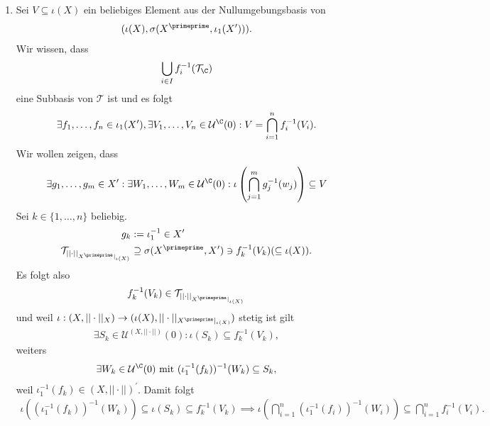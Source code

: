 \begin{solution}
\begin{enumerate}[label = (\arabic*)]
  \item Sei $V \subseteq \iota(X)$ ein beliebiges Element aus der Nullumgebungsbasis von
  \begin{align*}
    (\iota(X),\sigma(X^{\primeprime},\iota_1(X^{\prime}))).
  \end{align*}
  Wir wissen, dass
  \begin{align*}
    \bigcup_{i \in I}f_i^{-1}(\mathcal{T}_{\C})
  \end{align*}
  eine Subbasis von $\mathcal{T}$ ist und es folgt
  \begin{align*}
    \exists f_1,\dots,f_n \in \iota_1(X^{\prime}), \exists V_1,\dots,V_n \in \mathcal{U}^{\C}(0):
    V = \bigcap_{i=1}^n f_i^{-1}(V_i).
  \end{align*}
  Wir wollen zeigen, dass
  \begin{align*}
    \exists g_1,\dots,g_m \in X^{\prime}: \exists W_1,\dots,W_m \in \mathcal{U}^{\C}(0):
    \iota\left(\bigcap_{j=1}^m g_j^{-1}(w_j)\right) \subseteq V
  \end{align*}
  Sei $k \in \{1,\dots,n\}$ beliebig.
  \begin{align*}
    g_k &:= \iota_1^{-1} \in X^{\prime} \\
    \mathcal{T}_{||\cdot||_{X^{\primeprime}|_{\iota(X)}}} &\supseteq \sigma(X^{\primeprime},X^{\prime}) \ni f_k^{-1}(V_k)
    (\subseteq \iota(X)).
  \end{align*}
  Es folgt also
  \begin{align*}
    f_k^{-1}(V_k) \in \mathcal{T}_{||\cdot||_{X^{\primeprime}|_{\iota(X)}}}
  \end{align*}
  und weil $\iota: (X,||\cdot||_X) \rightarrow (\iota(X),||\cdot||_{X^{\primeprime}|_{\iota(X)}})$
  stetig ist gilt
  \begin{align*}
    \exists S_k \in \mathcal{U}^{(X,||\cdot||)}(0): \iota(S_k) \subseteq f_k^{-1}(V_k),
  \end{align*}
  weiters
  \begin{align*}
    \exists W_k \in \mathcal{U}^{\C}(0) ~\text{mit}~ (\iota_1^{-1}(f_k))^{-1}(W_k) \subseteq S_k,
  \end{align*}
  weil $\iota_1^{-1}(f_k) \in (X,||\cdot||)^{\prime}$. Damit folgt
  \begin{align*}
    \iota((\iota_1^{-1}(f_k))^{-1}(W_k)) \subseteq \iota(S_k) \subseteq f_k^{-1}(V_k)
    \implies \iota\left(\bigcap_{i=1}^n (\iota_1^{-1}(f_i))^{-1}(W_i)\right) \subseteq \bigcap_{i = 1}^nf_i^{-1}(V_i).

\end{align*}
\end{enumerate}
\end{solution}

